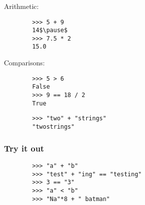 \documentclass[notes]{beamer}
\begin{document}
\begin{frame}[fragile]
\begin{itemize}
			
			
			
		\end{itemize}
	\end{frame}
	
	\begin{frame}[fragile]
		\frametitle{}
		
		Arithmetic:
		
		\begin{lstlisting}
		>>> 5 + 9
		14$\pause$
		>>> 7.5 * 2
		15.0
		\end{lstlisting}
		
		\pause
		
		Comparisons:
		
		\begin{lstlisting}
		>>> 5 > 6
		False
		>>> 9 == 18 / 2
		True
		\end{lstlisting}
		
		\pause
		
		\begin{lstlisting}
		>>> "two" + "strings"
		"twostrings" 
		\end{lstlisting}
	\end{frame}
	
	\begin{frame}[fragile]
		\frametitle{Try it out}
		
		\begin{lstlisting}
		>>> "a" + "b"
		>>> "test" + "ing" == "testing"
		>>> 3 == "3"
		>>> "a" < "b"
		>>> "Na"*8 + " batman"
		\end{lstlisting}
	\end{frame}
\end{document}
